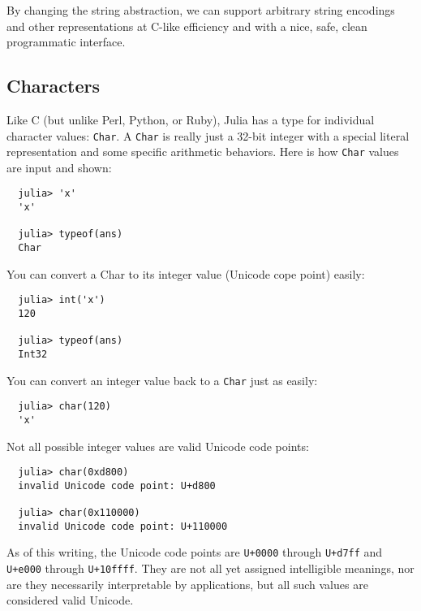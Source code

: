 \documentclass{article}
\begin{document}
By changing the string abstraction, we can support arbitrary string encodings and other representations at C-like efficiency and with a nice, safe, clean programmatic interface.

\subsection{Characters}

Like C (but unlike Perl, Python, or Ruby), Julia has a type for individual character values: \verb|Char|.
A \verb|Char| is really just a 32-bit integer with a special literal representation and some specific arithmetic behaviors.
Here is how \verb|Char| values are input and shown:
\begin{verbatim}
  julia> 'x'
  'x'

  julia> typeof(ans)
  Char
\end{verbatim}
You can convert a Char to its integer value (Unicode cope point) easily:
\begin{verbatim}
  julia> int('x')
  120

  julia> typeof(ans)
  Int32
\end{verbatim}
You can convert an integer value back to a \verb|Char| just as easily:
\begin{verbatim}
  julia> char(120)
  'x'
\end{verbatim}
Not all possible integer values are valid Unicode code points:
\begin{verbatim}
  julia> char(0xd800)
  invalid Unicode code point: U+d800

  julia> char(0x110000)
  invalid Unicode code point: U+110000
\end{verbatim}
As of this writing, the Unicode code points are \verb|U+0000| through \verb|U+d7ff| and \verb|U+e000| through \verb|U+10ffff|.
They are not all yet assigned intelligible meanings, nor are they necessarily interpretable by applications, but all such values are considered valid Unicode.
\end{document}
